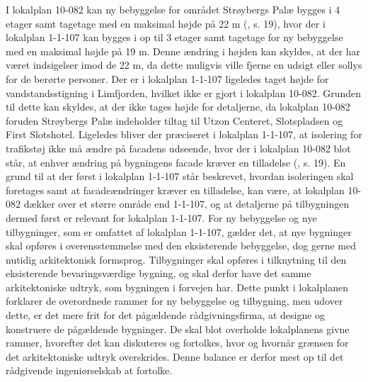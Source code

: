 I lokalplan 10-082 kan ny bebyggelse for området Strøybergs Palæ bygges i 4 etager samt tagetage med en maksimal højde på 22 m (\citep{gammellokalplan}, s. 19), hvor der i lokalplan 1-1-107 kan bygges i op til 3 etager samt tagetage for ny bebyggelse med en maksimal højde på 19 m. Denne ændring i højden kan skyldes, at der har været indsigelser imod de 22 m, da dette muligvis ville fjerne en udsigt eller sollys for de berørte personer. 
\newline \indent{     }  Der er i lokalplan 1-1-107 ligeledes taget højde for vandstandsstigning i Limfjorden, hvilket ikke er gjort i lokalplan 10-082. Grunden til dette kan skyldes, at der ikke tages højde for detaljerne, da lokalplan 10-082 foruden Strøybergs Palæ indeholder tiltag til Utzon Centeret, Slotspladsen og First Slotshotel.
\newline \indent{     }  Ligeledes bliver der præciseret i lokalplan 1-1-107, at isolering for trafikstøj ikke må ændre på facadens udseende, hvor der i lokalplan 10-082 blot står, at enhver ændring på bygningens facade kræver en tilladelse (\citep{gammellokalplan}, s. 19). En grund til at der først i lokalplan 1-1-107 står beskrevet, hvordan isoleringen skal foretages samt at facadeændringer kræver en tilladelse, kan være, at lokalplan 10-082 dækker over et større område end 1-1-107, og at detaljerne på tilbygningen dermed først er relevant for lokalplan 1-1-107. 
\newline \indent{     }  For ny bebyggelse og nye tilbygninger, som er omfattet af lokalplan 1-1-107, gælder det, at nye bygninger skal opføres i overensstemmelse med den eksisterende bebyggelse, dog gerne med nutidig arkitektonisk formsprog. Tilbygninger skal opføres i tilknytning til den eksisterende bevaringsværdige bygning, og skal derfor have det samme arkitektoniske udtryk, som bygningen i forvejen har. 
\newline \indent{     }  Dette punkt i lokalplanen forklarer de overordnede rammer for ny bebyggelse og tilbygning, men udover dette, er det mere frit for det pågældende rådgivningsfirma, at designe og konstruere de pågældende bygninger. De skal blot overholde lokalplanens givne rammer, hvorefter det kan diskuteres og fortolkes, hvor og hvornår grænsen for det arkitektoniske udtryk overskrides. Denne balance er derfor mest op til det rådgivende ingeniørselskab at fortolke.

